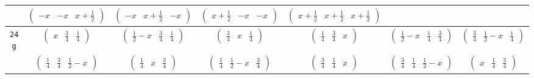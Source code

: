 \documentclass[fleqn,9pt,landscape]{jsarticle}
\begin{document}
\begin{center}
\begin{longtable}{ccccccc}
& $ \begin{pmatrix} - x & - x & x + \frac{1}{2} \end{pmatrix} $ & $ \begin{pmatrix} - x & x + \frac{1}{2} & - x \end{pmatrix} $ & $ \begin{pmatrix} x + \frac{1}{2} & - x & - x \end{pmatrix} $ & $ \begin{pmatrix} x + \frac{1}{2} & x + \frac{1}{2} & x + \frac{1}{2} \end{pmatrix} $ & $  $ & $  $ \\ \hline
{\tt 24g} & $ \begin{pmatrix} x & \frac{3}{4} & \frac{1}{4} \end{pmatrix} $ & $ \begin{pmatrix} \frac{1}{2} - x & \frac{3}{4} & \frac{1}{4} \end{pmatrix} $ & $ \begin{pmatrix} \frac{3}{4} & x & \frac{1}{4} \end{pmatrix} $ & $ \begin{pmatrix} \frac{1}{4} & \frac{3}{4} & x \end{pmatrix} $ & $ \begin{pmatrix} \frac{1}{2} - x & \frac{1}{4} & \frac{3}{4} \end{pmatrix} $ & $ \begin{pmatrix} \frac{3}{4} & \frac{1}{2} - x & \frac{1}{4} \end{pmatrix} $ \\
& $ \begin{pmatrix} \frac{1}{4} & \frac{3}{4} & \frac{1}{2} - x \end{pmatrix} $ & $ \begin{pmatrix} \frac{1}{4} & x & \frac{3}{4} \end{pmatrix} $ & $ \begin{pmatrix} \frac{1}{4} & \frac{1}{2} - x & \frac{3}{4} \end{pmatrix} $ & $ \begin{pmatrix} \frac{3}{4} & \frac{1}{4} & x \end{pmatrix} $ & $ \begin{pmatrix} \frac{3}{4} & \frac{1}{4} & \frac{1}{2} - x \end{pmatrix} $ & $ \begin{pmatrix} x & \frac{1}{4} & \frac{3}{4} \end{pmatrix} $ \\

\end{longtable}
\end{center}
\end{document}
